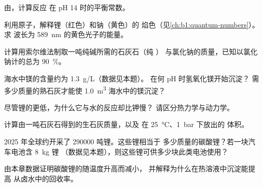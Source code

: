 \begin{exercise}[$\star$]\label{exo:b1:s-block:4}
由，计算反应 
在 pH 14 时的平衡常数。
\end{exercise}

\begin{exercise}[$\star\star$]\label{exo:b1:s-block:5}
利用原子，解释锂（红色）和钠（黄色）的
焰色（见\cref{ch:b1:quantum-numbers}）。求
波长为 \qty{589}{nm} 的黄色光子的能量。
\end{exercise}

\begin{exercise}[$\star\star$]\label{exo:b1:s-block:6}
计算用索尔维法制取一吨纯碱所需的石灰石（纯 ）
与氯化钠的质量，已知以氯化钠计的总为
\qty{90}{\percent}。
\end{exercise}

\begin{exercise}[$\star\star$]\label{exo:b1:s-block:7}
海水中镁的含量约为 \qty{1.3}{g/L}（数据见本题）。
在何 pH 时氢氧化镁开始沉淀？
需多少质量的熟石灰才能使 \qty{1.0}{m^3} 海水中的镁沉淀？
\end{exercise}

\begin{exercise}[$\star\star$]\label{exo:b1:s-block:8}
尽管锂的更低，为什么它与水的反应却比钾慢？
请区分热力学与动力学。
\end{exercise}

\begin{exercise}[$\star\star$]\label{exo:b1:s-block:9}
计算由一吨石灰石得到的生石灰质量，以及
在 \qty{25}{\celsius}、\qty{1}{bar} 下放出的  体积。
\end{exercise}

\begin{exercise}[$\star\star\star$]\label{exo:b1:s-block:10}
2025 年全球约开采了 \num{290000} 吨锂。这些锂相当于
多少质量的碳酸锂？若一块汽车电池含 \qty{8}{kg} 锂
（数据见本题），则这些锂可供多少块此类电池使用？
\end{exercise}

\begin{exercise}[$\star\star\star$]\label{exo:b1:s-block:11}
由本章数据证明碳酸锂的随温度升高而减小，
并解释为什么在热溶液中沉淀能提高
从卤水中的回收率。
\end{exercise}

